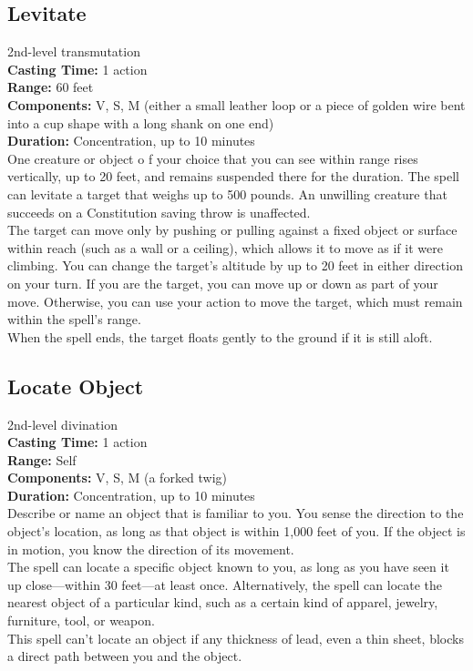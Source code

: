 \documentclass[11pt, A4paper, english]{article}
\begin{document}
		\subsection{Levitate}
2nd-level transmutation \\
\textbf{Casting Time:} 1 action \\
\textbf{Range:} 60 feet \\
\textbf{Components:} V, S, M (either a small leather loop or a piece of golden wire bent into a cup shape with a long shank on one end) \\
\textbf{Duration:} Concentration, up to 10 minutes \\
One creature or object o f your choice that you can see within range rises vertically, up to 20 feet, and remains suspended there for the duration. The spell can levitate a target that weighs up to 500 pounds. An unwilling creature that succeeds on a Constitution saving throw is unaffected. \\
The target can move only by pushing or pulling against a fixed object or surface within reach (such as a wall or a ceiling), which allows it to move as if it were climbing. You can change the target’s altitude by up to 20 feet in either direction on your turn. If you are the target, you can move up or down as part of your move. Otherwise, you can use your action to move the target, which must remain within the spell’s range. \\
When the spell ends, the target floats gently to the ground if it is still aloft.

		\subsection{Locate Object}
2nd-level divination \\
\textbf{Casting Time:} 1 action \\
\textbf{Range:} Self \\
\textbf{Components:} V, S, M (a forked twig) \\
\textbf{Duration:} Concentration, up to 10 minutes \\
Describe or name an object that is familiar to you. You sense the direction to the object’s location, as long as that object is within 1,000 feet of you. If the object is in motion, you know the direction of its movement. \\
The spell can locate a specific object known to you, as long as you have seen it up close—within 30 feet—at least once. Alternatively, the spell can locate the nearest object of a particular kind, such as a certain kind of apparel, jewelry, furniture, tool, or weapon. \\
This spell can’t locate an object if any thickness of lead, even a thin sheet, blocks a direct path between you and the object.
\end{document}
